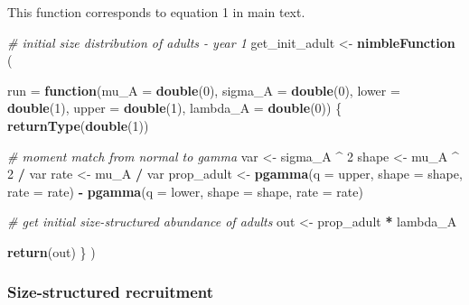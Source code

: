 \documentclass[
]{article}
\newenvironment{Shaded}{\begin{snugshade}}{\end{snugshade}}
\newcommand{\AttributeTok}[1]{\textcolor[rgb]{0.13,0.29,0.53}{#1}}
\newcommand{\CommentTok}[1]{\textcolor[rgb]{0.56,0.35,0.01}{\textit{#1}}}
\newcommand{\ControlFlowTok}[1]{\textcolor[rgb]{0.13,0.29,0.53}{\textbf{#1}}}
\newcommand{\DecValTok}[1]{\textcolor[rgb]{0.00,0.00,0.81}{#1}}
\newcommand{\FunctionTok}[1]{\textcolor[rgb]{0.13,0.29,0.53}{\textbf{#1}}}
\newcommand{\NormalTok}[1]{#1}
\newcommand{\OtherTok}[1]{\textcolor[rgb]{0.56,0.35,0.01}{#1}}
\newcommand{\SpecialCharTok}[1]{\textcolor[rgb]{0.81,0.36,0.00}{\textbf{#1}}}
\begin{document}
This function corresponds to equation 1 in main text.

\begin{Shaded}
\begin{Highlighting}[]
\CommentTok{\# initial size distribution of adults {-} year 1}
\NormalTok{get\_init\_adult }\OtherTok{\textless{}{-}} \FunctionTok{nimbleFunction}\NormalTok{ (}
  
  \AttributeTok{run =} \ControlFlowTok{function}\NormalTok{(}\AttributeTok{mu\_A =} \FunctionTok{double}\NormalTok{(}\DecValTok{0}\NormalTok{), }\AttributeTok{sigma\_A =} \FunctionTok{double}\NormalTok{(}\DecValTok{0}\NormalTok{),}
                 \AttributeTok{lower =} \FunctionTok{double}\NormalTok{(}\DecValTok{1}\NormalTok{), }\AttributeTok{upper =} \FunctionTok{double}\NormalTok{(}\DecValTok{1}\NormalTok{),}
                 \AttributeTok{lambda\_A =} \FunctionTok{double}\NormalTok{(}\DecValTok{0}\NormalTok{))}
\NormalTok{  \{}
    \FunctionTok{returnType}\NormalTok{(}\FunctionTok{double}\NormalTok{(}\DecValTok{1}\NormalTok{))}
    
    \CommentTok{\# moment match from normal to gamma}
\NormalTok{    var }\OtherTok{\textless{}{-}}\NormalTok{ sigma\_A }\SpecialCharTok{\^{}} \DecValTok{2}
\NormalTok{    shape }\OtherTok{\textless{}{-}}\NormalTok{ mu\_A }\SpecialCharTok{\^{}} \DecValTok{2} \SpecialCharTok{/}\NormalTok{ var}
\NormalTok{    rate }\OtherTok{\textless{}{-}}\NormalTok{ mu\_A }\SpecialCharTok{/}\NormalTok{ var}
\NormalTok{    prop\_adult }\OtherTok{\textless{}{-}} \FunctionTok{pgamma}\NormalTok{(}\AttributeTok{q =}\NormalTok{ upper, }\AttributeTok{shape =}\NormalTok{ shape, }\AttributeTok{rate =}\NormalTok{ rate) }\SpecialCharTok{{-}}
      \FunctionTok{pgamma}\NormalTok{(}\AttributeTok{q =}\NormalTok{ lower, }\AttributeTok{shape =}\NormalTok{ shape, }\AttributeTok{rate =}\NormalTok{ rate)}
    
    \CommentTok{\# get initial size{-}structured abundance of adults}
\NormalTok{    out }\OtherTok{\textless{}{-}}\NormalTok{ prop\_adult }\SpecialCharTok{*}\NormalTok{ lambda\_A}

    \FunctionTok{return}\NormalTok{(out)}
\NormalTok{  \}}
\NormalTok{)}
\end{Highlighting}
\end{Shaded}

\subsubsection{Size-structured
recruitment}\label{size-structured-recruitment}
\end{document}
